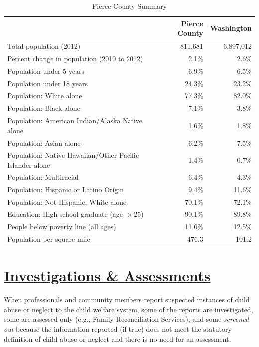 \documentclass{article}\usepackage{graphicx, color}
\begin{document}
\begin{table}[ht]
\centering
\caption{Pierce County Summary} 
\begin{tabular}{lrr}
  \toprule
 & Pierce County & Washington \\ 
  \midrule
Total population (2012) & 811,681 & 6,897,012 \\ 
  Percent change in population (2010 to 2012) & 2.1\% & 2.6\% \\ 
  Population under 5 years & 6.9\% & 6.5\% \\ 
  Population under 18 years & 24.3\% & 23.2\% \\ 
  Population: White alone & 77.3\% & 82.0\% \\ 
  Population: Black alone & 7.1\% & 3.8\% \\ 
  Population: American Indian/Alaska Native alone & 1.6\% & 1.8\% \\ 
  Population: Asian alone & 6.2\% & 7.5\% \\ 
  Population: Native Hawaiian/Other Pacific Islander alone & 1.4\% & 0.7\% \\ 
  Population: Multiracial & 6.4\% & 4.3\% \\ 
  Population: Hispanic or Latino Origin & 9.4\% & 11.6\% \\ 
  Population: Not Hispanic, White alone & 70.1\% & 72.1\% \\ 
  Education: High school graduate (age $>$25) & 90.1\% & 89.8\% \\ 
  People below poverty line (all ages) & 11.6\% & 12.5\% \\ 
  Population per square mile & 476.3 & 101.2 \\ 
   \bottomrule
\end{tabular}
\end{table}



\section{\href{http://www.partnersforourchildren.org//child-well-being/visualizations/investigations-assessments/trends}
{Investigations \& Assessments}}
When professionals and community members report suspected instances of child abuse or neglect to the child welfare system, some of the reports are investigated, some are assessed only (e.g., Family Reconciliation Services), and some \emph{screened out} because the information reported (if true) does not meet the statutory definition of child abuse or neglect and there is no need for an assessment.
\end{document}
